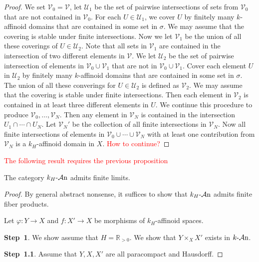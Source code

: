 \begin{proof}
    We set $\mathcal{V}_0=\mathcal{V}$, let $\mathcal{U}_1$ be the set of pairwise intersections of sets from $\mathcal{V}_0$ that are not contained in $\mathcal{V}_0$. For each $U\in \mathcal{U}_1$, we cover $U$ by finitely many $k$-affinoid domains that are contained in some set in $\sigma$. We may assume that the covering is stable under finite intersections. Now we let $\mathcal{V}_1$ be the union of all these coverings of $U\in \mathcal{U}_2$.
    Note that all sets in $\mathcal{V}_1$ are contained in the intersection of two different elements in $\mathcal{V}$. We let $\mathcal{U}_2$ be the set of pairwise intersection of elements in $\mathcal{V}_0\cup \mathcal{V}_1$ that are not in $\mathcal{V}_0\cup \mathcal{V}_1$. Cover each element $U$ in $\mathcal{U}_2$ by finitely many $k$-affinoid domains that are contained in some set in $\sigma$. The union of all these converings for $U\in \mathcal{U}_2$ is defined as $\mathcal{V}_2$. We may assume that the covering is stable under finite intersections.
    Then each element in $\mathcal{V}_2$ is contained in at least three different elements in $U$. We continue this procedure to produce $\mathcal{V}_0,\ldots,\mathcal{V}_N$. Then any element in $\mathcal{V}_N$ is contained in the intersection $U_1\cap \cdots\cap U_N$.
    Let $\mathcal{V}_N'$ be the collection of all finite intersections in $\mathcal{V}_N$. Now all finite intersections of elements in $\mathcal{V}_0\cup\cdots\cup \mathcal{V}_N$ with at least one contribution from $\mathcal{V}_N$ is a $k_H$-affinoid domain in $X$.
    \textcolor{red}{How to continue?}

    \fi
\end{proof}

\textcolor{red}{The following result requires the previous proposition}
\begin{proposition}
    The category $k_H\text{-}\mathcal{A}\mathrm{n}$ admits finite limits.
\end{proposition}
\begin{proof}
    By general abstract nonsense, it suffices to show that $k_H\text{-}\mathcal{A}\mathrm{n}$ admits finite fiber products.

    Let $\varphi:Y\rightarrow X$ and $f:X'\rightarrow X$ be morphisms of $k_H$-affinoid spaces. 

    \textbf{Step~1}. We show assume that $H=\mathbb{R}_{>0}$. We show that $Y\times_X X'$ exists in $k\text{-}\mathcal{A}\mathrm{n}$.

    \textbf{Step~1.1}. Assume that $Y,X,X'$ are all paracompact and Hausdorff.
\end{proof}

